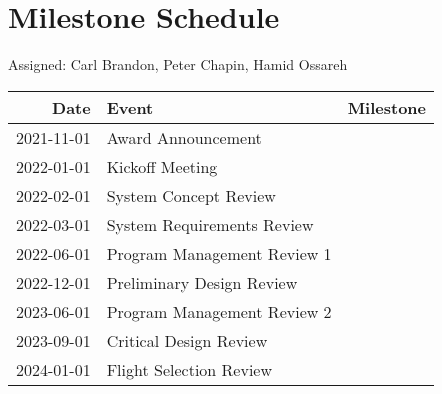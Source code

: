 \section{Milestone Schedule}
Assigned: Carl Brandon, Peter Chapin, Hamid Ossareh

\begin{tabular}{rll}
\hline
Date & Event & Milestone\\
\hline
2021-11-01 & Award Announcement & \\
2022-01-01 & Kickoff Meeting & \\
2022-02-01 & System Concept Review & \\
2022-03-01 & System Requirements Review & \\
2022-06-01 & Program Management Review 1 & \\
2022-12-01 & Preliminary Design Review & \\
2023-06-01 & Program Management Review 2 & \\
2023-09-01 & Critical Design Review & \\
2024-01-01 & Flight Selection Review & \\
\hline
\end{tabular}


